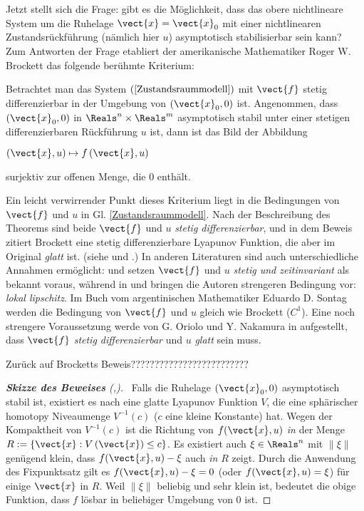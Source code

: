 Jetzt stellt sich die Frage: gibt es die Möglichkeit, dass das obere nichtlineare System um die Ruhelage $\vect{x}=\vect{x}_{0}$ mit einer nichtlinearen Zustandsrückführung (nämlich hier $u$) asymptotisch stabilisierbar sein kann? Zum Antworten der Frage etabliert der amerikanische Mathematiker Roger W. Brockett das folgende berühmte Kriterium\cite{brockett1983asymptotic}:
\begin{theorem}
	Betrachtet man das System $(\ref{Zustandsraummodell})$ mit $\vect{f}$ stetig differenzierbar in der Umgebung von $(\vect{x}_{0},0)$ ist. Angenommen, dass $(\vect{x}_{0},0)$ in $\Reals^{n}\times\Reals^{m}$ asymptotisch stabil unter einer stetigen differenzierbaren Rückführung $u$ ist, dann ist das Bild der Abbildung
	\begin{center}$\left ( \vect{x},u \right ) \mapsto f\left ( \vect{x},u \right )$\end{center}
	surjektiv zur offenen Menge, die 0 enthält.
\end{theorem}
Ein leicht verwirrender Punkt dieses Kriterium liegt in die Bedingungen von $\vect{f}$ und $u$ in Gl. \ref{Zustandsraummodell}. Nach der Beschreibung des Theorems sind beide $\vect{f}$ und $u$ \emph{stetig differenzierbar}, und in dem Beweis zitiert Brockett eine stetig differenzierbare Lyapunov Funktion, die aber im Original \emph{glatt} ist. (siehe \cite[S.186]{brockett1983asymptotic} und \cite[S.324]{wilson1967structure}.) In anderen Literaturen sind auch unterschiedliche Annahmen ermöglicht: \cite{coron2007control} und \cite{orsi2003necessary} setzen $\vect{f}$ und $u$ \emph{stetig und zeitinvariant} als bekannt voraus, während in \cite{stern2002brockett} und \cite{colonius2012nichtlineare} bringen die Autoren strengeren Bedingung vor: \emph{lokal lipschitz}. Im Buch vom argentinischen Mathematiker Eduardo D. Sontag \cite{sontag2013mathematical} werden die Bedingung von $\vect{f}$ und $u$ gleich wie Brockett ($C^{1}$). Eine noch strengere Voraussetzung werde von G. Oriolo und Y. Nakamura in \cite{oriolo1991control} aufgestellt, dass $\vect{f}$ \emph{stetig differenzierbar} und $u$ \emph{glatt} sein muss.

Zurück auf Brocketts Beweis?????????????????????????

\begin{proof}[\textbf{Skizze des Beweises} (\cite{brockett1983asymptotic},\cite{liberzon2012switching})]~Falls die Ruhelage $(\vect{x}_{0},0)$ asymptotisch stabil ist, existiert es nach \cite{wilson1967structure} eine glatte Lyapunov Funktion $V$, die eine sphärischer homotopy Niveaumenge $V^{-1}(c)$ ($c$ eine kleine Konstante) hat. Wegen der Kompaktheit von $V^{-1}(c)$ ist die Richtung von $f(\vect{x},u)$ \emph{in} der Menge $R:= \left \{ \vect{x}:V\left (\vect{x}  \right )\leq c \right \}$. Es existiert auch $\xi \in \Reals^{n}$ mit $\left \| \xi \right \|$ genügend klein, dass $f(\vect{x},u)-\xi$ auch \emph{in} $R$ zeigt. Durch die Anwendung des Fixpunktsatz gilt es $f(\vect{x},u)-\xi=0$ (oder $f(\vect{x},u)=\xi$) für einige $\vect{x}$ in $R$. Weil $\left \| \xi \right \|$ beliebig und sehr klein ist, bedeutet die obige Funktion, dass $f$ lösbar in beliebiger Umgebung von 0 ist.
\end{proof} %